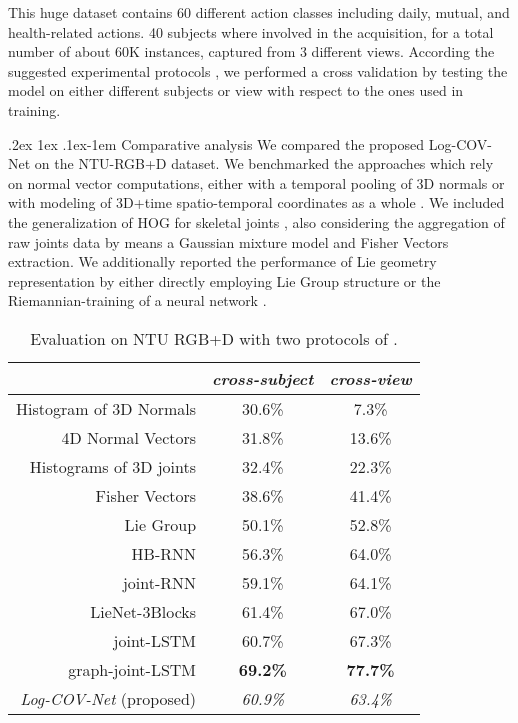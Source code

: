 \documentclass[10pt,twocolumn]{article}
\makeatletter
\renewcommand{\paragraph}{%
	\@startsection{paragraph}{4}%
	{\z@}{.2ex \@plus 1ex \@minus .1ex}{-1em}%
	{\normalfont\normalsize\bfseries}%
}
\makeatother
\begin{document}
This huge dataset contains 60 different action classes including daily, mutual, and health-related actions. 40 subjects where involved in the acquisition, for a total number of about 60K instances, captured from 3 different views. According the suggested experimental protocols \cite{Shahroudy:CVPR16}, we performed a cross validation by testing the model on either different subjects or view with respect to the ones used in training.

\paragraph{Comparative analysis} We compared the proposed Log-COV-Net on the NTU-RGB+D dataset. We benchmarked the approaches \cite{normal,Hnormal} which rely on normal vector computations, either with a temporal pooling of 3D normals \cite{Hnormal} or with modeling of 3D+time spatio-temporal coordinates as a whole \cite{normal}. We included the generalization of HOG for skeletal joints \cite{H3DJ}, also considering the aggregation of raw joints data by means a Gaussian mixture model and Fisher Vectors extraction. We additionally reported the performance of Lie geometry representation by either directly employing Lie Group structure \cite{Vemulapalli:CVPR14} or the Riemannian-training of a neural network \cite{deeplie}.  

\begin{table}[h!]
	\centering
	\begin{tabular}{|rcc|}
		\hline
		& {\footnotesize \textit{cross-subject}} & {\footnotesize \textit{cross-view}} \\ \hline\hline
		Histogram of 3D Normals \cite{Hnormal} & 30.6\% & 7.3\% \\
		4D Normal Vectors \cite{normal} & 31.8\% & 13.6\% \\
		Histograms of 3D joints \cite{H3DJ} & 32.4\% & 22.3\% \\
		Fisher Vectors \cite{quads} & 38.6\% & 41.4\% \\
		Lie Group \cite{Vemulapalli:CVPR14} & 50.1\% & 52.8\% \\  
		HB-RNN \cite{Du:CVPR15} & 56.3\% & 64.0\% \\
		joint-RNN \cite{Shahroudy:CVPR16}  & 59.1\% & 64.1\% \\
		LieNet-3Blocks \cite{deeplie} & 61.4\% & 67.0\% \\
		joint-LSTM \cite{Shahroudy:CVPR16} & 60.7\% & 67.3\% \\
		graph-joint-LSTM \cite{Liu:ECCV16} & \textbf{69.2\%} & \textbf{77.7\%} \\ \hline \hline
		\textit{\textit{Log-COV-Net} } (proposed) & \textit{60.9\%} & \textit{63.4\%} \\ \hline
	\end{tabular}\vspace{5pt}
	\caption{Evaluation on NTU RGB+D with two protocols of \cite{Shahroudy:CVPR16}.}
	\label{tab:NTU}
\end{table}
\end{document}
